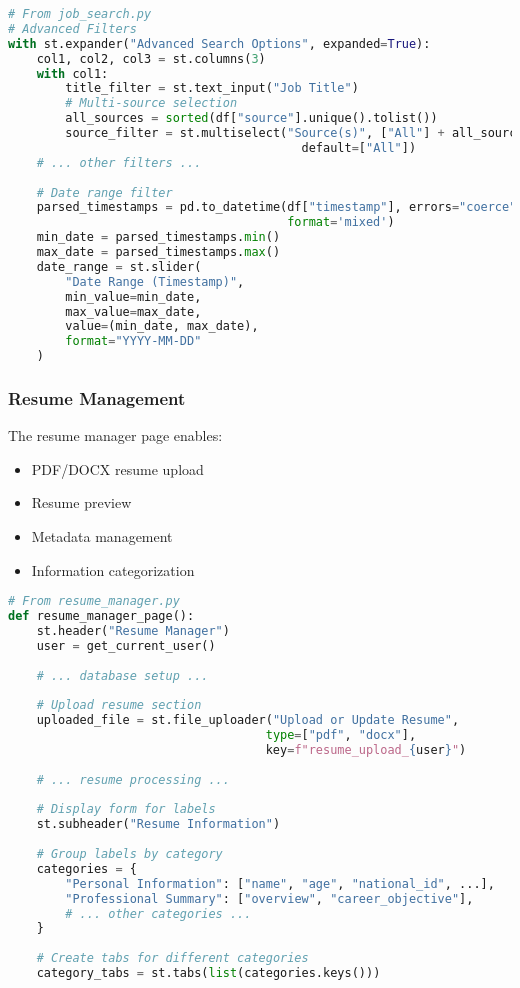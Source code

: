 \documentclass[12pt,a4paper]{article}
\begin{document}
\begin{lstlisting}[language=Python, caption=Advanced Search Implementation]
# From job_search.py
# Advanced Filters
with st.expander("Advanced Search Options", expanded=True):
    col1, col2, col3 = st.columns(3)
    with col1:
        title_filter = st.text_input("Job Title")
        # Multi-source selection
        all_sources = sorted(df["source"].unique().tolist())
        source_filter = st.multiselect("Source(s)", ["All"] + all_sources, 
                                         default=["All"])
    # ... other filters ...
    
    # Date range filter
    parsed_timestamps = pd.to_datetime(df["timestamp"], errors="coerce", 
                                       format='mixed')
    min_date = parsed_timestamps.min()
    max_date = parsed_timestamps.max()
    date_range = st.slider(
        "Date Range (Timestamp)",
        min_value=min_date,
        max_value=max_date,
        value=(min_date, max_date),
        format="YYYY-MM-DD"
    )
\end{lstlisting}

\subsubsection{Resume Management}
The resume manager page enables:
\begin{itemize}
    \item PDF/DOCX resume upload
    \item Resume preview
    \item Metadata management
    \item Information categorization
\end{itemize}

\begin{lstlisting}[language=Python, caption=Resume Manager Implementation (Excerpt)]
# From resume_manager.py
def resume_manager_page():
    st.header("Resume Manager")
    user = get_current_user()
    
    # ... database setup ...
    
    # Upload resume section
    uploaded_file = st.file_uploader("Upload or Update Resume", 
                                    type=["pdf", "docx"], 
                                    key=f"resume_upload_{user}")
    
    # ... resume processing ...
    
    # Display form for labels
    st.subheader("Resume Information")
    
    # Group labels by category
    categories = {
        "Personal Information": ["name", "age", "national_id", ...],
        "Professional Summary": ["overview", "career_objective"],
        # ... other categories ...
    }
    
    # Create tabs for different categories
    category_tabs = st.tabs(list(categories.keys()))
\end{lstlisting}
\end{document}
